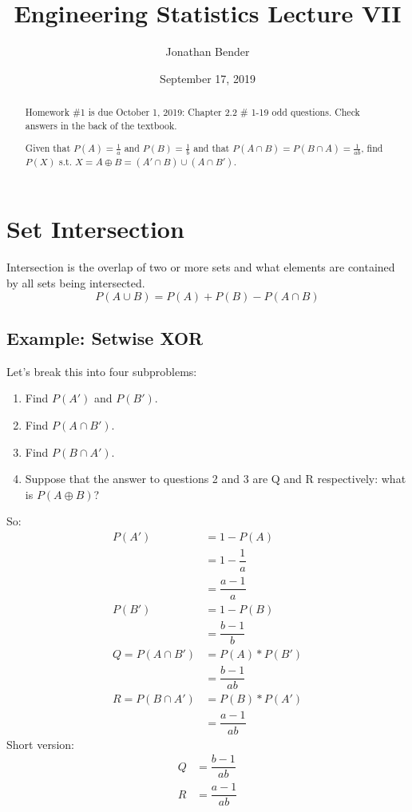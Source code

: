 \documentclass[]{article}
\title{Engineering Statistics Lecture VII}
\author{Jonathan Bender}
\date{September 17, 2019}
\begin{document}
\maketitle

\begin{abstract}
Homework \#1 is due October 1, 2019:
Chapter 2.2 \# 1-19 odd questions.
Check answers in the back of the textbook.
\end{abstract}

\section{Set Intersection}
Intersection is the overlap of two or more sets and what elements are contained by all sets being intersected.
\begin{equation}
	P(A \cup B) = P(A) + P(B) - P(A\cap B)
	\label{Probability of union}
\end{equation}

\subsection{Example: Setwise XOR}
\begin{abstract}
	Given that $P(A) = \frac{1}{a}$ and $P(B) = \frac{1}{b}$ and that $P(A\cap B) = P(B\cap A) = \frac{1}{ab}$, find $P(X)$ s.t. $X = A \oplus B = (A' \cap B) \cup (A \cap B')$.
\end{abstract}
Let's break this into four subproblems:
\begin{enumerate}
	\item Find $P(A')$ and $P(B')$.
	\item Find $P(A \cap B').$
	\item Find $P(B \cap A').$
	\item Suppose that the answer to questions 2 and 3 are Q and R respectively: what is $P(A \oplus B)$?
\end{enumerate}
\pagebreak

So:
\begin{align*}
P(A') &= 1 - P(A)
\\    &= 1 - \dfrac{1}{a} 
\\    &= \dfrac{a - 1}{a} \\
P(B') &= 1 - P(B)
\\    &= \dfrac{b - 1}{b} \\
Q = P(A\cap B') &= P(A) * P(B')
\\    &= \dfrac{b - 1}{ab} \\
R = P(B\cap A') &= P(B) * P(A')
\\   &= \dfrac{a - 1}{ab}
\end{align*}
Short version:
\begin{align*}
Q &= \dfrac{b-1}{ab} \\
R &= \dfrac{a-1}{ab}
\end{align*}
\end{document}
